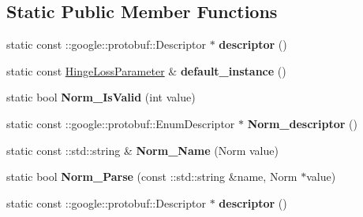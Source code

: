 \subsection*{Static Public Member Functions}
\begin{DoxyCompactItemize}
\item 
\mbox{\label{classcaffe_1_1_hinge_loss_parameter_a445e77cab3c15730228496bc6d074a50}} 
static const \+::google\+::protobuf\+::\+Descriptor $\ast$ {\bfseries descriptor} ()
\item 
\mbox{\label{classcaffe_1_1_hinge_loss_parameter_aa180f3ee536a81f02206c1ff433890ce}} 
static const \mbox{\hyperlink{classcaffe_1_1_hinge_loss_parameter}{Hinge\+Loss\+Parameter}} \& {\bfseries default\+\_\+instance} ()
\item 
\mbox{\label{classcaffe_1_1_hinge_loss_parameter_a4c08201dbc4ea88cec0e7c153f7f3163}} 
static bool {\bfseries Norm\+\_\+\+Is\+Valid} (int value)
\item 
\mbox{\label{classcaffe_1_1_hinge_loss_parameter_a6aa538200e2bb376f3fea4b72399fae2}} 
static const \+::google\+::protobuf\+::\+Enum\+Descriptor $\ast$ {\bfseries Norm\+\_\+descriptor} ()
\item 
\mbox{\label{classcaffe_1_1_hinge_loss_parameter_ad5aec808196586b93f860d2082d12e20}} 
static const \+::std\+::string \& {\bfseries Norm\+\_\+\+Name} (Norm value)
\item 
\mbox{\label{classcaffe_1_1_hinge_loss_parameter_aa17bbda463cf74c1f826d60e56d04095}} 
static bool {\bfseries Norm\+\_\+\+Parse} (const \+::std\+::string \&name, Norm $\ast$value)
\item 
\mbox{\label{classcaffe_1_1_hinge_loss_parameter_a46ba16d41269cc11509f220ccdfb3f2c}} 
static const \+::google\+::protobuf\+::\+Descriptor $\ast$ {\bfseries descriptor} ()
\item 
\mbox{\label{classcaffe_1_1_hinge_loss_parameter_aafb313bcc00c7748c1a4514831d36e5d}} 

\end{DoxyCompactItemize}

